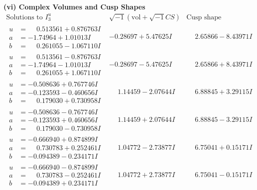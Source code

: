 \documentclass[1p]{elsarticle_modified}
\theoremstyle{definition}
\newcommand{\I}{\sqrt{-1}}
\begin{document}
\newpage\flushleft \textbf{(vi) Complex Volumes and Cusp Shapes}
$$\begin{array}{c|c|c}  
\text{Solutions to }I^u_{3}& \I (\text{vol} + \sqrt{-1}CS) & \text{Cusp shape}\\
 \hline 
\begin{aligned}
u &= \phantom{-}0.513561 + 0.876763 I \\
a &= -1.74964 + 1.01013 I \\
b &= \phantom{-}0.261055 - 1.067110 I\end{aligned}
 & -0.28697 + 5.47625 I & \phantom{-}2.65866 - 8.43971 I \\ \hline\begin{aligned}
u &= \phantom{-}0.513561 - 0.876763 I \\
a &= -1.74964 - 1.01013 I \\
b &= \phantom{-}0.261055 + 1.067110 I\end{aligned}
 & -0.28697 - 5.47625 I & \phantom{-}2.65866 + 8.43971 I \\ \hline\begin{aligned}
u &= -0.508636 + 0.767746 I \\
a &= -0.123593 - 0.460656 I \\
b &= \phantom{-}0.179030 + 0.730958 I\end{aligned}
 & \phantom{-}1.14459 - 2.07644 I & \phantom{-}6.88845 + 3.29115 I \\ \hline\begin{aligned}
u &= -0.508636 - 0.767746 I \\
a &= -0.123593 + 0.460656 I \\
b &= \phantom{-}0.179030 - 0.730958 I\end{aligned}
 & \phantom{-}1.14459 + 2.07644 I & \phantom{-}6.88845 - 3.29115 I \\ \hline\begin{aligned}
u &= -0.666940 + 0.874899 I \\
a &= \phantom{-}0.730783 + 0.252461 I \\
b &= -0.094389 - 0.234171 I\end{aligned}
 & \phantom{-}1.04772 - 2.73877 I & \phantom{-}6.75041 + 0.15171 I \\ \hline\begin{aligned}
u &= -0.666940 - 0.874899 I \\
a &= \phantom{-}0.730783 - 0.252461 I \\
b &= -0.094389 + 0.234171 I\end{aligned}
 & \phantom{-}1.04772 + 2.73877 I & \phantom{-}6.75041 - 0.15171 I \\ \hline\begin{aligned}

\end{aligned}
\end{array}$$
\end{document}
